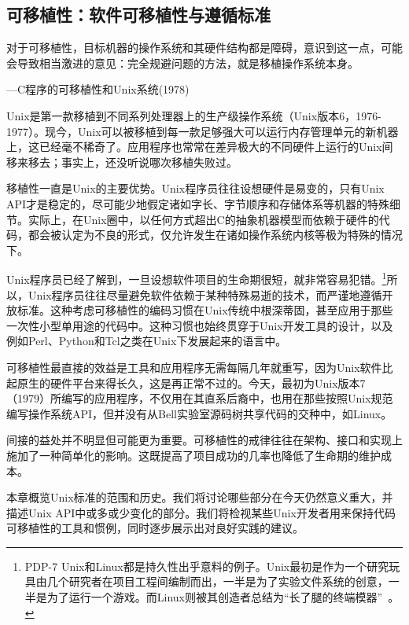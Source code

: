 \documentclass[12pt,oneside]{ctexbook}
\begin{document}
\begin{common-format}
\chapter{可移植性：软件可移植性与遵循标准}
\begin{flushright}
\begin{notecard}{30em}
对于可移植性，目标机器的操作系统和其硬件结构都是障碍，意识到这一点，可能会导致相当激进的意见：完全规避问题的方法，就是移植操作系统本身。

{\hfill —C程序的可移植性和Unix系统(1978)}
\end{notecard}
\end{flushright}


Unix是第一款移植到不同系列处理器上的生产级操作系统（Unix版本6，1976-1977）。现今，Unix可以被移植到每一款足够强大可以运行内存管理单元的新机器上，这已经毫不稀奇了。应用程序也常常在差异极大的不同硬件上运行的Unix间移来移去；事实上，还没听说哪次移植失败过。

移植性一直是Unix的主要优势。Unix程序员往往设想硬件是易变的，只有Unix API才是稳定的，尽可能少地假定诸如字长、字节顺序和存储体系等机器的特殊细节。实际上，在Unix圈中，以任何方式超出C的抽象机器模型而依赖于硬件的代码，都会被认定为不良的形式，仅允许发生在诸如操作系统内核等极为特殊的情况下。

Unix程序员已经了解到，一旦设想软件项目的生命期很短，就非常容易犯错。\footnote{PDP-7 Unix和Linux都是持久性出乎意料的例子。Unix最初是作为一个研究玩具由几个研究者在项目工程间编制而出，一半是为了实验文件系统的创意，一半是为了运行一个游戏。而Linux则被其创造者总结为“长了腿的终端模器”~\cite{Torvalds}。}所以，Unix程序员往往尽量避免软件依赖于某种特殊易逝的技术，而严谨地遵循开放标准。这种考虑可移植性的编码习惯在Unix传统中根深蒂固，甚至应用于那些一次性小型单用途的代码中。这种习惯也始终贯穿于Unix开发工具的设计，以及例如Perl、Python和Tcl之类在Unix下发展起来的语言中。

可移植性最直接的效益是工具和应用程序无需每隔几年就重写，因为Unix软件比起原生的硬件平台来得长久，这是再正常不过的。今天，最初为Unix版本7（1979）所编写的应用程序，不仅用在其直系后裔中，也用在那些按照Unix规范编写操作系统API，但并没有从Bell实验室源码树共享代码的交种中，如Linux。

间接的益处并不明显但可能更为重要。可移植性的戒律往往在架构、接口和实现上施加了一种简单化的影响。这既提高了项目成功的几率也降低了生命期的维护成本。

本章概览Unix标准的范围和历史。我们将讨论哪些部分在今天仍然意义重大，并描述Unix API中或多或少变化的部分。我们将检视某些Unix开发者用来保持代码可移植性的工具和惯例，同时逐步展示出对良好实践的建议。


\end{common-format}
\end{document}
